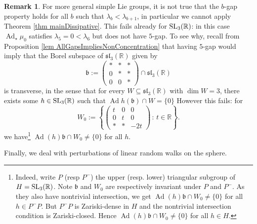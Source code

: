 \documentclass[11pt, leqno, fleqn]{amsart}
\def \kb{ {\mathfrak{b}} }
\def\SL{   {\rm SL}}
\def \R{{\mathbb R}}
\theoremstyle{definition}
\newtheorem{rema}[thm]{\bf Remark}
\theoremstyle{definition}
\DeclareMathOperator{\Ad}{Ad}
\begin{document}
		
\begin{rema}\label{disc-moregen-simplegroups}	For more general simple Lie groups, it is not true that the $b$-gap property holds for all $b$ such that $\lambda_{b}<\lambda_{b+1}$, in particular we cannot apply Theorem \ref{thm mainDissipative}. This fails already for $\SL_{3}(\R)$: in this case $\Ad_{\star}\mu_{0}$  satisfies $\lambda_{5}=0<\lambda_{6}$ but does not have $5$-gap. To see why, recall from  Proposition \ref{lem AllGapsImpliesNonConcentration} that having $5$-gap would imply that the Borel subspace of $\mathfrak{sl}_{3}(\R)$ given by
	$$\mathfrak b:=\begin{pmatrix} *&*&* \\ 0 &*&*\\0&0&*\end{pmatrix}\cap \mathfrak{sl}_{3}(\R)$$
	is transverse, in the sense that for every $W\subseteq \mathfrak{sl}_{3}(\R)$ with $\dim W=3$, there exists some $h\in \SL_{3}(\R)$ such that  
	$\Ad h(\mathfrak b)\cap W=\{0\}$ 
	However this fails:  for 
	$$W_{0}:=\left\{\begin{pmatrix} t&0&0 \\0&t&0\\ * &*&-2t\end{pmatrix}\,:\, t\in \R \right\}.$$
	we have\footnote{
		Indeed, write $P$ (resp $P^-$) the upper (resp. lower) triangular subgroup of $H=\SL_{3}(\R)$.  Note $\kb$ and $W_{0}$ are respectively invariant under $P$ and $P^-$. As they also have nontrivial intersection, we get $\Ad(h)\kb\cap W_{0}\neq \{0\}$ for all $h\in P^-P$. But $P^-P$ is Zariski-dense in $H$ and the nontrivial  intersection condition is Zariski-closed. Hence $\Ad(h)\kb\cap W_{0}\neq \{0\}$ for all $h\in H$.
	} $\Ad(h)\kb\cap W_{0}\neq \{0\}$ for all $h$.
	
\end{rema}	
	
	Finally, we deal with perturbations of linear random walks on the sphere. 
\end{document}
